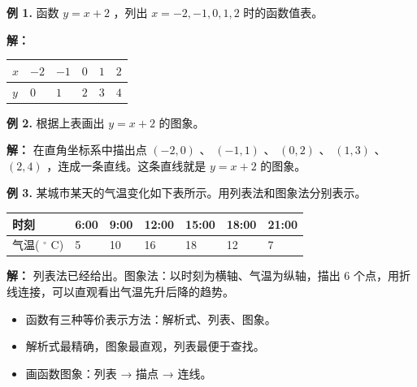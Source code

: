 \begin{workedexamples}


\textbf{例 1.} 函数 $y = x + 2$ ，列出 $x = -2, -1, 0, 1, 2$ 时的函数值表。

\textbf{解：}

\begin{center}
\begin{tabular}{llllll}
\toprule
$x$ & $-2$ & $-1$ & $0$ & $1$ & $2$ \\
\midrule
$y$ & $0$ & $1$ & $2$ & $3$ & $4$ \\
\bottomrule
\end{tabular}
\end{center}


\textbf{例 2.} 根据上表画出 $y = x + 2$ 的图象。

\textbf{解：} 在直角坐标系中描出点 $(-2, 0)$ 、 $(-1, 1)$ 、 $(0, 2)$ 、 $(1, 3)$ 、 $(2, 4)$ ，连成一条直线。这条直线就是 $y = x + 2$ 的图象。

\textbf{例 3.} 某城市某天的气温变化如下表所示。用列表法和图象法分别表示。

\begin{center}
\begin{tabular}{lllllll}
\toprule
时刻 & 6:00 & 9:00 & 12:00 & 15:00 & 18:00 & 21:00 \\
\midrule
气温( $^\circ$ C) & 5 & 10 & 16 & 18 & 12 & 7 \\
\bottomrule
\end{tabular}
\end{center}


\textbf{解：} 列表法已经给出。图象法：以时刻为横轴、气温为纵轴，描出 $6$ 个点，用折线连接，可以直观看出气温先升后降的趋势。

\end{workedexamples}

\begin{keytakeaway}


\begin{itemize}
  \item 函数有三种等价表示方法：解析式、列表、图象。
  \item 解析式最精确，图象最直观，列表最便于查找。
  \item 画函数图象：列表 → 描点 → 连线。
\end{itemize}


\end{keytakeaway}

